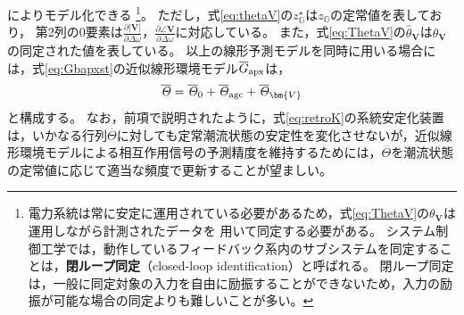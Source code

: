 \documentclass[tombow,dvipdfmx]{corona-a5-1.1}
\begin{document}
によりモデル化できる
\footnote{
電力系統は常に安定に運用されている必要があるため，式\ref{eq:ThetaV}の$\theta_{\bm{V}}$は運用しながら計測されたデータを
用いて同定する必要がある。
システム制御工学では，動作しているフィードバック系内のサブシステムを同定することは，\textbf{閉ループ同定}（closed-loop identification）と呼ばれる\cite{ljung1998system}。
閉ループ同定は，一般に同定対象の入力を自由に励振することができないため，入力の励振が可能な場合の同定よりも難しいことが多い。
}。
ただし，式\ref{eq:thetaV}の$z_{\mathds G}^{\star}$は$z_{\mathds G}$の定常値を表しており，
第2列の0要素は$\tfrac{\partial |\bm{V}| }{\partial \Delta \omega}$，$\tfrac{\partial \angle \bm{V} }{\partial \Delta \omega}$に対応している。
また，式\ref{eq:ThetaV}の$\hat{\theta}_{\bm{V}}$は$\theta_{\bm{V}}$の同定された値を表している。
以上の線形予測モデルを同時に用いる場合には，式\ref{eq:Gbapxst}の近似線形環境モデル$\overline{G}_{\rm apx}$は，
\[
\overline{\mathit{\Theta}}=
\overline{\mathit{\Theta}}_{0}+
\overline{\mathit{\Theta}}_{\rm agc}+
\overline{\mathit{\Theta}}_{\bm{V}}
\]
と構成する。
なお，前項で説明されたように，式\ref{eq:retroK}の系統安定化装置は，いかなる行列$\overline{\mathit{\Theta}}$に対しても定常潮流状態の安定性を変化させないが，近似線形環境モデルによる相互作用信号の予測精度を維持するためには，$\overline{\mathit{\Theta}}$を潮流状態の定常値に応じて適当な頻度で更新することが望ましい。


\newpage
%
%
\end{document}
